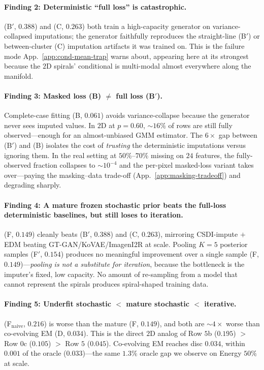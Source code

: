 \documentclass{article}
\theoremstyle{plain}
\theoremstyle{definition}
\theoremstyle{remark}
\begin{document}
\paragraph{Finding 2: Deterministic ``full loss'' is catastrophic.}
(B$'$, $0.388$) and (C, $0.263$) both train a high-capacity generator on variance-collapsed imputations; the generator faithfully reproduces the straight-line (B$'$) or between-cluster (C) imputation artifacts it was trained on. This is the failure mode App.~\ref{app:cond-mean-trap} warns about, appearing here at its strongest because the $2$D spirals' conditional is multi-modal almost everywhere along the manifold.

\paragraph{Finding 3: Masked loss (B) $\neq$ full loss (B$'$).}
Complete-case fitting (B, $0.061$) avoids variance-collapse because the generator never sees imputed values. In $2$D at $p = 0.60$, ${\sim}16\%$ of rows are still fully observed---enough for an almost-unbiased GMM estimator. The $6\times$ gap between (B$'$) and (B) isolates the cost of \emph{trusting} the deterministic imputations versus ignoring them. In the real setting at $50\%$--$70\%$ missing on $24$ features, the fully-observed fraction collapses to $\sim 10^{-4}$ and the per-pixel masked-loss variant takes over---paying the masking--data trade-off (App.~\ref{app:masking-tradeoff}) and degrading sharply.

\paragraph{Finding 4: A mature frozen stochastic prior beats the full-loss deterministic baselines, but still loses to iteration.}
(F, $0.149$) cleanly beats (B$'$, $0.388$) and (C, $0.263$), mirroring CSDI-impute $+$ EDM beating GT-GAN/KoVAE/ImagenI2R at scale. Pooling $K = 5$ posterior samples (F$'$, $0.154$) produces no meaningful improvement over a single sample (F, $0.149$)---\emph{pooling is not a substitute for iteration}, because the bottleneck is the imputer's fixed, low capacity. No amount of re-sampling from a model that cannot represent the spirals produces spiral-shaped training data.

\paragraph{Finding 5: Underfit stochastic $<$ mature stochastic $<$ iterative.}
(F$_{\mathrm{naive}}$, $0.216$) is worse than the mature (F, $0.149$), and both are ${\sim}4\times$ worse than co-evolving EM (D, $0.034$). This is the direct $2$D analog of Row $5$b ($0.195$) $>$ Row $0$c ($0.105$) $>$ Row $5$ ($0.045$). Co-evolving EM reaches disc $0.034$, within $0.001$ of the oracle ($0.033$)---the same $1.3\%$ oracle gap we observe on Energy $50\%$ at scale.
\end{document}
